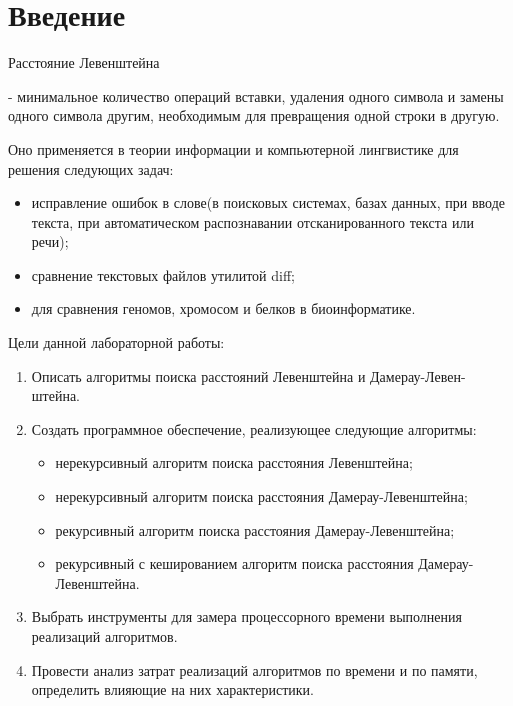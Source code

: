 \chapter*{Введение} %

\begin{bfseries}Расстояние Левенштейна\end{bfseries} - минимальное количество операций вставки, удаления одного символа и замены 
одного символа другим, необходимым для превращения одной строки в другую.

Оно применяется в теории информации и компьютерной лингвистике для решения следующих задач:

\begin{itemize}[label=---] %
    \item исправление ошибок в слове(в поисковых системах, базах данных, при вводе текста, при автоматическом распознавании отсканированного текста или речи);
	\item сравнение текстовых файлов утилитой diff;
	\item для сравнения геномов, хромосом и белков в биоинформатике.
\end{itemize}


Цели данной лабораторной работы:
\begin{enumerate}[label={\arabic*)}] %
	\item Описать алгоритмы поиска расстояний Левенштейна и Дамерау-Левен- штейна.
	\item Создать программное обеспечение, реализующее следующие алгоритмы:
	\begin{itemize}[label=---]
		\item нерекурсивный алгоритм поиска расстояния Левенштейна;
		\item нерекурсивный алгоритм поиска расстояния Дамерау-Левенштейна;
		\item рекурсивный алгоритм поиска расстояния Дамерау-Левенштейна;
		\item рекурсивный с кешированием алгоритм поиска расстояния Дамерау-Левенштейна.
	\end{itemize}
	\item Выбрать инструменты для замера процессорного времени выполнения реализаций алгоритмов.
	\item Провести анализ затрат реализаций алгоритмов по времени и по памяти, определить влияющие на них характеристики.
\end{enumerate}

